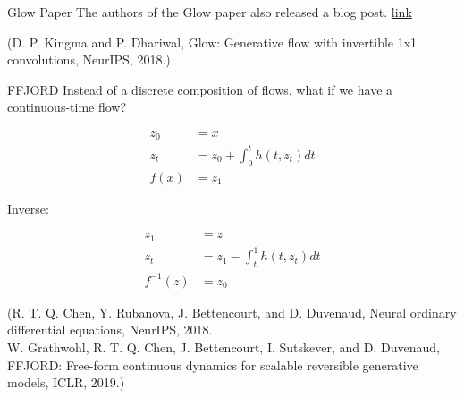 \begin{frame}[allowframebreaks]

\begin{mydefinitionblock}{10.33}{Glow Paper}
    The authors of the Glow paper also released a blog post.
    \href{https://openai.com/blog/glow/}{link}

    (D. P. Kingma and P. Dhariwal, Glow: Generative flow with invertible 1x1 convolutions, NeurIPS, 2018.)
\end{mydefinitionblock}

\end{frame}

\begin{frame}[allowframebreaks]

\begin{mydefinitionblock}{10.34}{FFJORD}
    Instead of a discrete composition of flows, what if we have a continuous-time flow?

    $$
    \begin{aligned}
    z_{0} & =x \\
    z_{t} & =z_{0}+\int_{0}^{t} h\left(t, z_{t}\right) d t \\
    f(x) & =z_{1}
    \end{aligned}
    $$

    Inverse:

    $$
    \begin{aligned}
    z_{1} & =z \\
    z_{t} & =z_{1}-\int_{t}^{1} h\left(t, z_{t}\right) d t \\
    f^{-1}(z) & =z_{0}
    \end{aligned}
    $$

    (R. T. Q. Chen, Y. Rubanova, J. Bettencourt, and D. Duvenaud, Neural ordinary differential equations, NeurIPS, 2018.\\
    W. Grathwohl, R. T. Q. Chen, J. Bettencourt, I. Sutskever, and D. Duvenaud, FFJORD: Free-form continuous dynamics for scalable reversible generative models, ICLR, 2019.)
\end{mydefinitionblock}

\end{frame}
